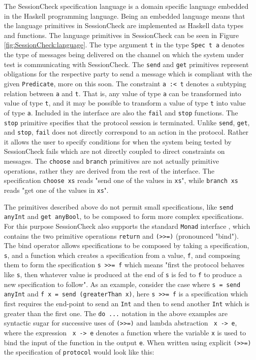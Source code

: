 \documentclass{article}
\begin{document}
The SessionCheck specification language is a domain specific language embedded in the Haskell \cite{Haskell}
programming language.
%
Being an embedded language means that the language primitives in SessionCheck are
implemented as Haskell data types and functions.
%
The language primitives in SessionCheck can be seen in Figure \ref{fig:SessionCheck:language}.
%
The type argument \texttt{t} in the type \texttt{Spec t a} denotes the type of messages
being delivered on the channel on which the system under test is communicating
with SessionCheck.
%
The \texttt{send} and \texttt{get} primitives represent obligations for the respective party to send a message
which is compliant with the given \texttt{Predicate}, more on this soon.
%
The constraint \texttt{a :< t} denotes a subtyping relation between \texttt{a} and \texttt{t}.
%
That is, any value of type \texttt{a} can be transformed into value of type \texttt{t}, and it may be
possible to transform a value of type \texttt{t} into value of type \texttt{a}.
%
Included in the interface are also the \texttt{fail} and \texttt{stop} functions.
%
The \texttt{stop} primitive specifies that the protocol session is terminated.
%
Unlike \texttt{send}, \texttt{get}, and \texttt{stop}, \texttt{fail} does not directly correspond to an action in the protocol.
%
Rather it allows the user to specify conditions for when the system being tested by SessionCheck fails
which are not directly coupled to direct constraints on messages.
%
The \texttt{choose} and \texttt{branch} primitives are not actually primitive operations, rather they are derived from
the rest of the interface.
%
The specification \texttt{choose xs} reads "send one of the values in \texttt{xs}", while \texttt{branch xs} reads "get one
of the values in \texttt{xs}".

The primitives described above do not permit small specifications, like \texttt{send anyInt} and \texttt{get anyBool}, to
be composed to form more complex specifications.
%
For this purpose SessionCheck also supports the standard \texttt{Monad} interface \cite{WadlerMonad}, which contains the
two primitive operations \texttt{return} and \texttt{(>>=)} (pronounced "bind").
%
The bind operator allows specifications to be composed by taking a specification, \texttt{s}, and a function which
creates a specification from a value, \texttt{f}, and composing them to form the specification \texttt{s >>= f} which means
"first the protocol behaves like \texttt{s}, then whatever value is produced at the end of \texttt{s} is fed to \texttt{f} to produce
a new specification to follow".
%
As an example, consider the case where \texttt{s = send anyInt} and \texttt{f x = send (greaterThan x)}, here \texttt{s >>= f} is
a specification which first requires the end-point to send an \texttt{Int} and then to send another \texttt{Int} which is greater
than the first one.
%
The \texttt{do ...} notation in the above examples are syntactic sugar for successive uses of \texttt{(>>=)} and lambda abstraction
\texttt{\ x -> e}, where the expression \texttt{\ x -> e} denotes a function where the variable \texttt{x} is used to bind the input of
the function in the output \texttt{e}.
%
When written using explicit \texttt{(>>=)} the specification of \texttt{protocol} would look like this:
%
\end{document}
